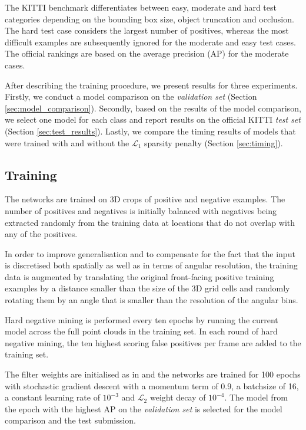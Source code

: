 \documentclass[letterpaper, 10 pt, conference]{tex_style/ieeeconf}
\begin{document}
The KITTI benchmark differentiates between easy, moderate and hard test categories depending on the bounding box size, object truncation and occlusion.
The hard test case considers the largest number of positives, whereas the most difficult examples are subsequently ignored for the moderate and easy test cases.
The official rankings are based on the average precision (AP) for the moderate cases.

After describing the training procedure, we present results for three experiments.
Firstly, we conduct a model comparison on the \emph{validation set} (Section \ref{sec:model_comparison}).
Secondly, based on the results of the model comparison, we select one model for each class and report results on the official KITTI \emph{test set} (Section \ref{sec:test_results}).
Lastly, we compare the timing results of models that were trained with and without the $\mathcal{L}_1$ sparsity penalty (Section \ref{sec:timing}).



\subsection{Training}
The networks are trained on 3D crops of positive and negative examples.
The number of positives and negatives is initially balanced with negatives being extracted randomly from the training data at locations that do not overlap with any of the positives.

In order to improve generalisation and to compensate for the fact that the input is discretised both spatially as well as in terms of angular resolution, the training data is augmented by translating the original front-facing positive training examples by a distance smaller than the size of the 3D grid cells and randomly rotating them by an angle that is smaller than the resolution of the angular bins.

Hard negative mining is performed every ten epochs by running the current model across the full point clouds in the training set.
In each round of hard negative mining, the ten highest scoring false positives per frame are added to the training set.

The filter weights are initialised as in \cite{he2015delving} and the networks are trained for 100 epochs with stochastic gradient descent with a momentum term of 0.9, a batchsize of 16, a constant learning rate of $10^{-3}$ and $\mathcal{L}_2$ weight decay of $10^{-4}$.
The model from the epoch with the highest AP on the \emph{validation set} is selected for the model comparison and the test submission.
\end{document}

